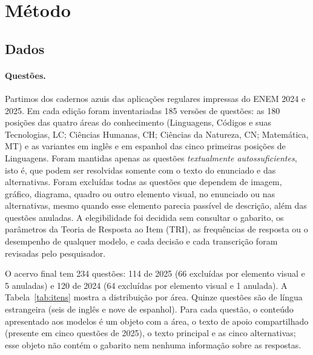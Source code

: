 
\section{Método}\label{sec:metodo}

\subsection{Dados}\label{sec:dados}

\paragraph{Questões.} Partimos dos cadernos azuis das aplicações regulares impressas do ENEM 2024 e 2025. Em cada edição foram inventariadas 185 versões de questões: as 180 posições das quatro áreas do conhecimento (Linguagens, Códigos e suas Tecnologias, LC; Ciências Humanas, CH; Ciências da Natureza, CN; Matemática, MT) e as variantes em inglês e em espanhol das cinco primeiras posições de Linguagens. Foram mantidas apenas as questões \emph{textualmente autossuficientes}, isto é, que podem ser resolvidas somente com o texto do enunciado e das alternativas. Foram excluídas todas as questões que dependem de imagem, gráfico, diagrama, quadro ou outro elemento visual, no enunciado ou nas alternativas, mesmo quando esse elemento parecia passível de descrição, além das questões anuladas. A elegibilidade foi decidida sem consultar o gabarito, os parâmetros da Teoria de Resposta ao Item (TRI), as frequências de resposta ou o desempenho de qualquer modelo, e cada decisão e cada transcrição foram revisadas pelo pesquisador.

O acervo final tem 234 questões: 114 de 2025 (66 excluídas por elemento visual e 5 anuladas) e 120 de 2024 (64 excluídas por elemento visual e 1 anulada). A Tabela~\ref{tab:itens} mostra a distribuição por área. Quinze questões são de língua estrangeira (seis de inglês e nove de espanhol). Para cada questão, o conteúdo apresentado aos modelos é um objeto com a área, o texto de apoio compartilhado (presente em cinco questões de 2025), o texto principal e as cinco alternativas; esse objeto não contém o gabarito nem nenhuma informação sobre as respostas.



